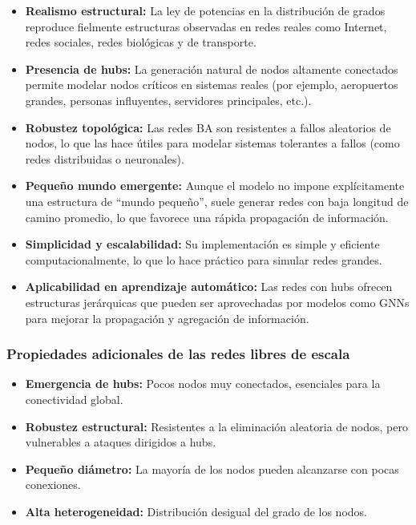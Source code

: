 \begin{itemize}
    \item \textbf{Realismo estructural:} La ley de potencias en la distribución de grados reproduce fielmente estructuras observadas en redes reales como Internet, redes sociales, redes biológicas y de transporte.
    
    \item \textbf{Presencia de hubs:} La generación natural de nodos altamente conectados permite modelar nodos críticos en sistemas reales (por ejemplo, aeropuertos grandes, personas influyentes, servidores principales, etc.).
    
    \item \textbf{Robustez topológica:} Las redes BA son resistentes a fallos aleatorios de nodos, lo que las hace útiles para modelar sistemas tolerantes a fallos (como redes distribuidas o neuronales).
    
    \item \textbf{Pequeño mundo emergente:} Aunque el modelo no impone explícitamente una estructura de “mundo pequeño”, suele generar redes con baja longitud de camino promedio, lo que favorece una rápida propagación de información.

    \item \textbf{Simplicidad y escalabilidad:} Su implementación es simple y eficiente computacionalmente, lo que lo hace práctico para simular redes grandes.
    
    \item \textbf{Aplicabilidad en aprendizaje automático:} Las redes con hubs ofrecen estructuras jerárquicas que pueden ser aprovechadas por modelos como GNNs para mejorar la propagación y agregación de información.
\end{itemize}

\subsubsection*{Propiedades adicionales de las redes libres de escala}

\begin{itemize}
    \item \textbf{Emergencia de hubs:} Pocos nodos muy conectados, esenciales para la conectividad global.
    \item \textbf{Robustez estructural:} Resistentes a la eliminación aleatoria de nodos, pero vulnerables a ataques dirigidos a hubs.
    \item \textbf{Pequeño diámetro:} La mayoría de los nodos pueden alcanzarse con pocas conexiones.
    \item \textbf{Alta heterogeneidad:} Distribución desigual del grado de los nodos.
\end{itemize}

